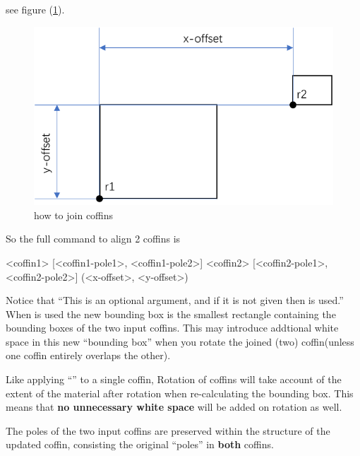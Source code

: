 \documentclass[
    lang=en, 
    class=article,
    classOption={11pt},
    toc={redef}
]{zlatex}
\begin{document}
see figure (\ref{fig:join-coffins}).
\begin{figure}[!htb]
    \centering
    \includegraphics[width=.65\linewidth]{join_coffins.pdf}
    \caption{how to join coffins}
    \label{fig:join-coffins}
\end{figure}

So the full command to align 2 coffins is 
\begin{code}[latex]
\JoinCoffins
    <coffin1> [<coffin1-pole1>, <coffin1-pole2>]
    <coffin2> [<coffin2-pole1>, <coffin2-pole2>]
    (<x-offset>, <y-offset>)
\end{code}

Notice that ``This  is an optional argument, and if it is not given then \cmd{(0pt, 0pt)} is used.''
When \cmd{\JoinCoffins} is used the new bounding box is the smallest rectangle containing the bounding boxes of the two 
input coffins. This may introduce addtional white space in this new ``bounding box'' when you rotate the joined (two) 
coffin(unless one coffin entirely overlaps the other).

Like applying ``'' to a single coffin, Rotation of coffins will take account of the extent of the material 
after rotation when re-calculating the bounding box. This means that \textbf{no unnecessary white space} will be added on 
rotation as well.

The poles of the two input coffins are preserved within the structure of the updated coffin, consisting the original 
``poles'' in \textbf{both} coffins.
\end{document}
